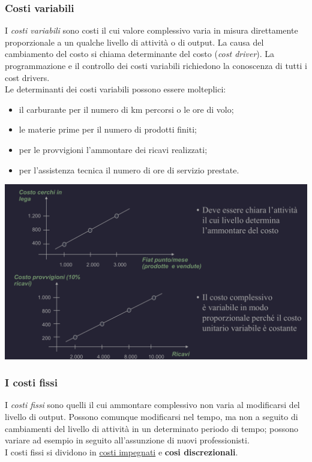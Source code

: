 \documentclass{article}
\begin{document}
\subsubsection{Costi variabili}
I \textit{costi variabili} sono costi il cui valore complessivo varia in misura direttamente proporzionale a un qualche livello di attività o di output. La causa del cambiamento del costo si chiama determinante del costo (\textit{cost driver}). La programmazione e il controllo dei costi variabili richiedono la conoscenza di tutti i cost drivers.
\vspace*{0.2cm}\\
Le determinanti dei costi variabili possono essere molteplici:
\begin{itemize}
    \item il carburante per il numero di km percorsi o le ore di volo;
    \item le materie prime per il numero di prodotti finiti;
    \item per le provvigioni l'ammontare dei ricavi realizzati;
    \item per l'assistenza tecnica il numero di ore di servizio prestate.
\end{itemize}

\begin{center}
    \includegraphics[scale=0.3]{Image/Costi_Var.png}
\end{center}


\subsubsection{I costi fissi}
I \textit{costi fissi} sono quelli il cui ammontare complessivo non varia al modificarsi del livello di output. Possono comunque modificarsi nel tempo, ma non a seguito di cambiamenti del livello di attività in un determinato periodo di tempo; possono variare ad esempio in seguito all'assunzione di nuovi professionisti.
\vspace*{0.1cm}\\
I costi fissi si dividono in \underline{costi impegnati} e \textbf{cosi discrezionali}.
\vspace{0.2cm}\\
\end{document}
